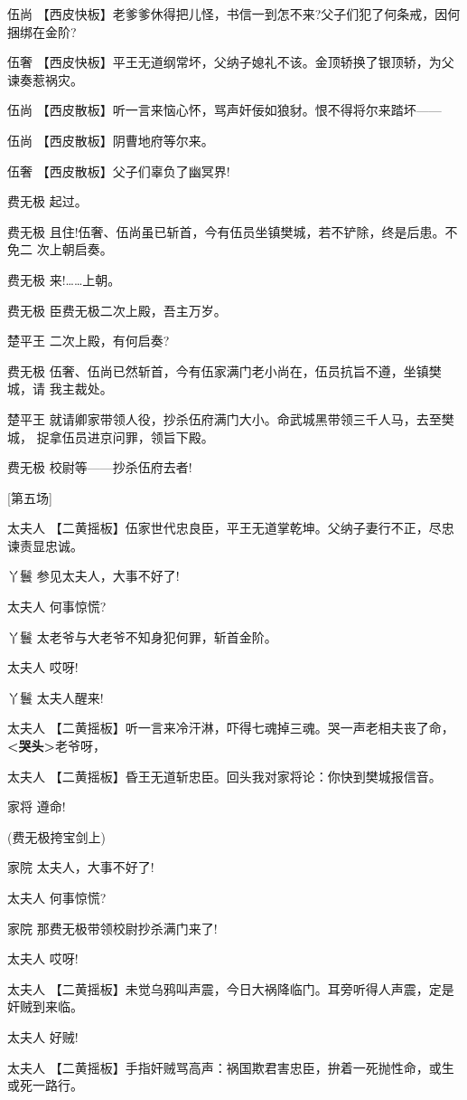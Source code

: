 伍尚
【西皮快板】老爹爹休得把儿怪，书信一到怎不来?父子们犯了何条戒，因何捆绑在金阶?

伍奢
【西皮快板】平王无道纲常坏，父纳子媳礼不该。金顶轿换了银顶轿，为父谏奏惹祸灾。

伍尚 【西皮散板】听一言来恼心怀，骂声奸佞如狼豺。恨不得将尔来踏坏------

伍尚 【西皮散板】阴曹地府等尔来。

伍奢 【西皮散板】父子们辜负了幽冥界!

费无极 起过。

费无极
且住!伍奢、伍尚虽已斩首，今有伍员坐镇樊城，若不铲除，终是后患。不免二
次上朝启奏。

费无极 来!\ldots{}\ldots{}上朝。

费无极 臣费无极二次上殿，吾主万岁。

楚平王 二次上殿，有何启奏?

费无极
伍奢、伍尚已然斩首，今有伍家满门老小尚在，伍员抗旨不遵，坐镇樊城，请
我主裁处。

楚平王
就请卿家带领人役，抄杀伍府满门大小。命武城黑带领三千人马，去至樊城，
捉拿伍员进京问罪，领旨下殿。

费无极 校尉等------抄杀伍府去者!

{[}第五场{]}

太夫人
【二黄摇板】伍家世代忠良臣，平王无道掌乾坤。父纳子妻行不正，尽忠谏责显忠诚。

丫鬟 参见太夫人，大事不好了!

太夫人 何事惊慌?

丫鬟 太老爷与大老爷不知身犯何罪，斩首金阶。

太夫人 哎呀!

丫鬟 太夫人醒来!

太夫人
【二黄摇板】听一言来冷汗淋，吓得七魂掉三魂。哭一声老相夫丧了命，\textbf{\textless{}哭头\textgreater{}}老爷呀，

太夫人 【二黄摇板】昏王无道斩忠臣。回头我对家将论：你快到樊城报信音。

家将 遵命!

(费无极挎宝剑上)

家院 太夫人，大事不好了!

太夫人 何事惊慌?

家院 那费无极带领校尉抄杀满门来了!

太夫人 哎呀!

太夫人
【二黄摇板】未觉乌鸦叫声震，今日大祸降临门。耳旁听得人声震，定是奸贼到来临。

太夫人 好贼!

太夫人
【二黄摇板】手指奸贼骂高声：祸国欺君害忠臣，拚着一死抛性命，或生或死一路行。

